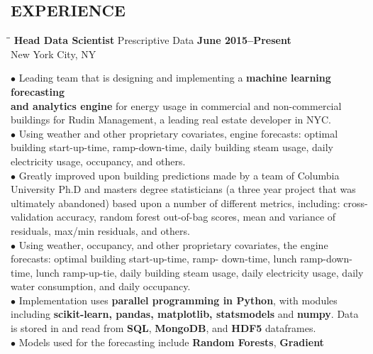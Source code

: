 \documentclass{resume}
\begin{document}
 
\address{ 
\href{mailto:david.karapetyan@gmail.com}{\nolinkurl{david.karapetyan@gmail.com}}
\\
\url{http://davidkarapetyan.com}}
\begin{resume}
\section{EXPERIENCE}
	\vspace{-0.05mm}

\begin{tabbing}
\hspace{2.3in}\= \hspace{2.6in}\= \kill
{\bf Head Data Scientist} \> Prescriptive Data   
\>\textbf{June 2015--Present } \\
    \>New York City, NY 
\end{tabbing}
$\bullet$
Leading team that is designing and implementing a \textbf{machine learning
forecasting \\ and analytics engine} for energy usage in commercial and non-commercial
buildings for Rudin Management, a leading real estate developer in NYC.  \\
$\bullet$ Using weather and other proprietary covariates, engine forecasts: optimal building start-up-time, ramp-down-time, 
daily building steam usage, daily electricity usage, occupancy, and others. \\
$\bullet$ 
Greatly improved upon building predictions made by a team of Columbia University
Ph.D and masters degree statisticians (a three year project that was ultimately
abandoned) based upon a number of different metrics,
including: cross-validation accuracy, random forest out-of-bag
scores, mean and variance of residuals, max/min residuals, and others. \\
$\bullet$
Using weather, occupancy, and other proprietary covariates, the engine forecasts: optimal building start-up-time, ramp-
down-time, lunch ramp-down-time, lunch ramp-up-tie, daily building steam usage,
daily electricity usage, daily water consumption, and daily occupancy.
\\
$\bullet$
Implementation uses \textbf{parallel programming in Python}, 
with modules including \textbf{scikit-learn, pandas, matplotlib, statsmodels}
and \textbf{numpy}.
Data is stored in and read from \textbf{SQL}, \textbf{MongoDB}, and \textbf{HDF5} dataframes.\\
$\bullet$
Models used for the forecasting include \textbf{Random Forests}, \textbf{Gradient
}
\end{resume}
\end{document}
